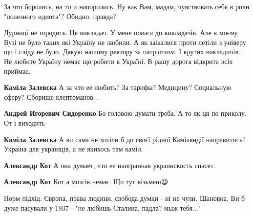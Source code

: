 \begin{itemize}
За что боролись, на то и напоролись. Ну как Вам, мадам, чувствовать себя в роли "полезного идиота"? Обидно, правда?



Дурниці не городить. Це викладач. У мене повага до викладачів. Але в моєму Вузі
не було таких які Україну не любили. А як заікалися проти летіли з універу що і
сліду не було. Дякую нашому ректору за патріотизм. І крутих викладичів. Не
любите Україну немає що робити в Україні. В рашу дорога відкрита всіх приймає.

\begin{itemize}

\textbf{Каміла Залевска} А за что ее любить? За тарифы? Медицину? Социальную сферу?
Сборище клептоманов...


\textbf{Андрей Игоревич Сидоренко} Бо головою думати треба. А то як ця по приколу. От і виходить


\textbf{Каміла Залевска} А ви сама не хотіли б до своєї рідної Каміляндії направитись? Україна для українців, а не якихось там каміл.


\textbf{Александр Кот} А она думает, что ее наигранная украинскость спасет. \Smiley[1. 0][yellow]


\textbf{Александр Кот} Кот а мозгів немає. Що тут візьмеш😆


Норм підхід. Європа, права людини, свобода думки - ні не чули. Шановна, Ви б дуже пасували у 1937 - "не любишь Сталина, падла? мыж тебя..."


\end{itemize}
\end{itemize}
